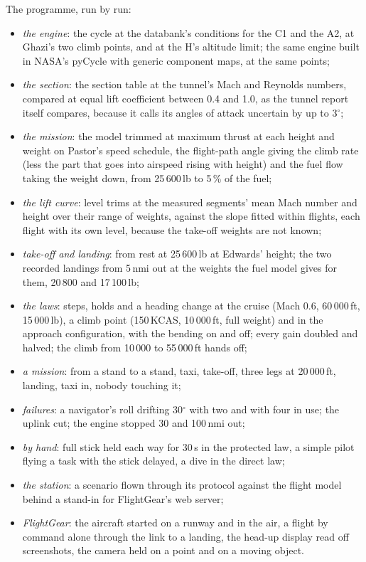 \documentclass[10pt,a4paper,twocolumn]{article}
\begin{document}
The programme, run by run:
\begin{itemize}
\item \emph{the engine}: the cycle at the databank's conditions for the C1 and the A2, at Ghazi's two climb points, and at the H's altitude limit; the
same engine built in NASA's pyCycle \cite{pyc} with generic component maps, at the same points;
\item \emph{the section}: the section table at the tunnel's Mach and Reynolds numbers, compared at equal lift coefficient between 0.4 and 1.0, as the
tunnel report itself compares, because it calls its angles of attack uncertain by up to 3$^\circ$;
\item \emph{the mission}: the model trimmed at maximum thrust at each height and weight on Pastor's speed schedule, the flight-path angle giving the
climb rate (less the part that goes into airspeed rising with height) and the fuel flow taking the weight down, from 25\,600\,lb to 5\,\% of the fuel;
\item \emph{the lift curve}: level trims at the measured segments' mean Mach number and height over their range of weights, against the slope fitted
within flights, each flight with its own level, because the take-off weights are not known;
\item \emph{take-off and landing}: from rest at 25\,600\,lb at Edwards' height; the two recorded landings from 5\,nmi out at the weights the fuel
model gives for them, 20\,800 and 17\,100\,lb;
\item \emph{the laws}: steps, holds and a heading change at the cruise (Mach 0.6, 60\,000\,ft, 15\,000\,lb), a climb point (150\,KCAS, 10\,000\,ft, full
weight) and in the approach configuration, with the bending on and off; every gain doubled and halved; the climb from 10\,000 to 55\,000\,ft hands off;
\item \emph{a mission}: from a stand to a stand, taxi, take-off, three legs at 20\,000\,ft, landing, taxi in, nobody touching it;
\item \emph{failures}: a navigator's roll drifting 30$^\circ$ with two and with four in use; the uplink cut; the engine stopped 30 and 100\,nmi out;
\item \emph{by hand}: full stick held each way for 30\,s in the protected law, a simple pilot flying a task with the stick delayed, a dive in the direct law;
\item \emph{the station}: a scenario flown through its protocol against the flight model behind a stand-in for FlightGear's web server;
\item \emph{FlightGear}: the aircraft started on a runway and in the air, a flight by command alone through the link to a landing, the head-up
display read off screenshots, the camera held on a point and on a moving object.
\end{itemize}
\end{document}

